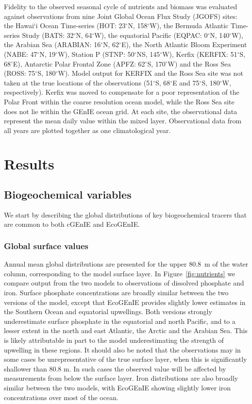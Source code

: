 \documentclass[gmd, manuscript]{copernicus}
\begin{document}
{Fidelity to the observed seasonal cycle of nutrients and biomass was evaluated against observations from nine Joint Global Ocean Flux Study (JGOFS) sites: the Hawai$\!$`i Ocean Time-series (HOT: 23$^\circ$N, 158$^\circ$W), the Bermuda Atlantic Time-series Study (BATS: 32$^\circ$N, 64$^\circ$W), the equatorial Pacific (EQPAC: 0$^\circ$N, 140$^\circ$W), the Arabian Sea (ARABIAN: 16$^\circ$N, 62$^\circ$E), the North Atlantic Bloom Experiment (NABE: 47$^\circ$N, 19$^\circ$W), Station P (STNP: 50$^\circ$NS, 145$^\circ$W), Kerfix (KERFIX: 51$^\circ$S, 68$^\circ$E), Antarctic Polar Frontal Zone (APFZ: 62$^\circ$S, 170$^\circ$W) and the Ross Sea (ROSS: 75$^\circ$S, 180$^\circ$W). Model output for KERFIX and the Ross Sea site was not taken at the true locations of the observations (51$^\circ$S, 68$^\circ$E and 75$^\circ$S, 180$^\circ$W, respectively). Kerfix was moved to compensate for a poor representation of the Polar Front within the coarse resolution ocean model, while the Ross Sea site does not lie within the GEnIE ocean grid. At each site, the observational data represent the mean daily value within the mixed layer. Observational data from all years are plotted together as one climatological year.

\section{Results}\label{Results}

\subsection{Biogeochemical variables}

We start by describing the global distributions of key biogeochemical tracers that are common to both cGEnIE and EcoGEnIE.

\subsubsection{Global surface values}

Annual mean global distributions are presented for the upper 80.8~m of the water column, corresponding to the model surface layer. In Figure~\ref{fig:nutrients} we compare output from the two models to observations of dissolved phosphate and iron. Surface phosphate concentrations are broadly similar between the two versions of the model, except that EcoGEnIE provides slightly lower estimates in the Southern Ocean and equatorial upwellings. Both versions strongly underestimate surface phosphate in the equatorial and north Pacific, and to a lesser extent in the north and east Atlantic, the Arctic and the Arabian Sea. This is likely attributable in part to the model underestimating the strength of upwelling in these regions. It should also be noted that the observations may in some cases be unrepresentative of the true surface layer, when this is significantly shallower than 80.8 m. In such cases the observed value will be affected by measurements from below the surface layer. Iron distributions are also broadly similar between the two models, with EcoGEnIE showing slightly lower iron concentrations over most of the ocean. 

}
\end{document}

